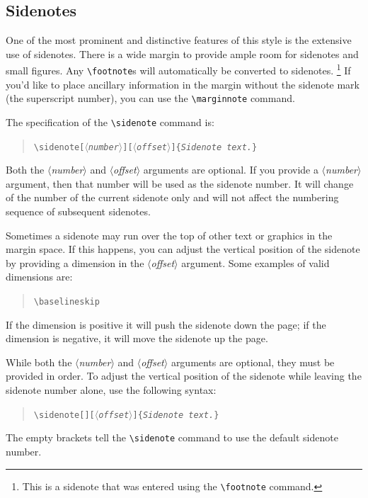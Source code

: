 \documentclass{tufte-handout}
\newcommand{\doccmd}[1]{\texttt{\textbackslash#1}}%
\newcommand{\docopt}[1]{\ensuremath{\langle}\textrm{\textit{#1}}\ensuremath{\rangle}}%
\newcommand{\docarg}[1]{\textrm{\textit{#1}}}%
\newenvironment{docspec}{\begin{quote}\noindent}{\end{quote}}%
\begin{document}
\subsection{Sidenotes}\label{sec:sidenotes}
One of the most prominent and distinctive features of this style is the
extensive use of sidenotes.  There is a wide margin to provide ample room
for sidenotes and small figures. Any \Verb|\footnote|s will automatically
be converted to sidenotes.
\footnote{
   This is a sidenote that was entered
  using the \texttt{\textbackslash footnote} command.
  }
If you'd like to place ancillary
information in the margin without the sidenote mark (the superscript
number), you can use the \Verb|\marginnote| command.

The specification of the \Verb|\sidenote| command is:
\begin{docspec}
  \doccmd{sidenote[\docopt{number}][\docopt{offset}]\{\docarg{Sidenote text.}\}}
\end{docspec}

Both the \docopt{number} and \docopt{offset} arguments are optional.  If you
provide a \docopt{number} argument, then that number will be used as the
sidenote number.  It will change of the number of the current sidenote only and
will not affect the numbering sequence of subsequent sidenotes.

Sometimes a sidenote may run over the top of other text or graphics in the
margin space.  If this happens, you can adjust the vertical position of the
sidenote by providing a dimension in the \docopt{offset} argument.  Some
examples of valid dimensions are:
\begin{docspec}
  \ttfamily 1.0in \qquad 2.54cm \qquad 254mm \Verb|\baselineskip|
\end{docspec}
If the dimension is positive it will push the sidenote down the page; if the
dimension is negative, it will move the sidenote up the page.

While both the \docopt{number} and \docopt{offset} arguments are optional, they
must be provided in order.  To adjust the vertical position of the sidenote
while leaving the sidenote number alone, use the following syntax:
\begin{docspec}
  \doccmd{sidenote[][\docopt{offset}]\{\docarg{Sidenote text.}\}}
\end{docspec}
The empty brackets tell the \Verb|\sidenote| command to use the default
sidenote number.
\end{document}
